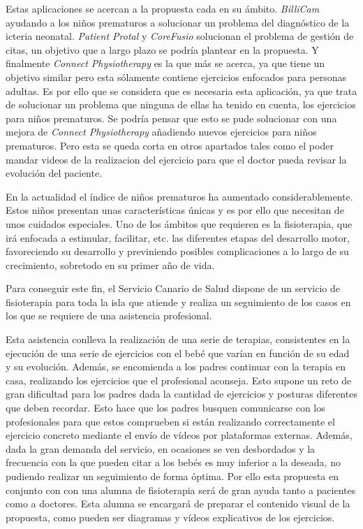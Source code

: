 \medskip
Estas aplicaciones se acercan a la propuesta cada en su ámbito. \textit{BilliCam} ayudando
a los niños prematuros a solucionar un problema del diagnóstico de la icteria neonatal.
\textit{Patient Protal} y \textit{CoreFusio} solucionan el problema de gestión de citas, un
objetivo que a largo plazo se podría plantear en la propuesta. Y finalmente
\textit{Connect Physiotherapy} es la que más se acerca, ya que tiene un objetivo similar
pero esta sólamente contiene ejercicios enfocados para personas adultas. Es por ello que
se considera que es necesaria esta aplicación, ya que trata de solucionar un problema que
ninguna de ellas ha tenido en cuenta, los ejercicios para niños prematuros. Se podría pensar
que esto se pude solucionar con una mejora de \textit{Connect Physiotherapy} añadiendo nuevos
ejercicios para niños prematuros. Pero esta se
queda corta en otros apartados tales como el poder mandar videos de la realizacion del
ejercicio para que el doctor pueda revisar la evolución del paciente.

\bigskip
En la actualidad el índice de niños prematuros ha aumentado considerablemente. Estos niños presentan
unas características únicas y es por ello que necesitan de unos cuidados especiales. Uno de los
ámbitos que requieren es la fisioterapia, que irá enfocada a estimular, facilitar, etc. las
diferentes etapas del desarrollo motor, favoreciendo su desarrollo y previniendo posibles
complicaciones a lo largo de su crecimiento, sobretodo en su primer año de vida.

Para conseguir este fin, el Servicio Canario de Salud dispone de un servicio de fisioterapia
para toda la isla que atiende y realiza un seguimiento de los casos en los que se requiere de
una asistencia profesional.

Esta asistencia conlleva la realización de una serie de terapias, consistentes en
la ejecución de una serie de ejercicios con el bebé que varían en función de su edad y su
evolución. Además, se encomienda a los padres continuar con la terapia en casa, realizando
los ejercicios que el profesional aconseja. Esto supone un reto de gran dificultad para los
padres dada la cantidad de ejercicios y posturas diferentes que deben recordar. Esto hace que
los padres busquen comunicarse con los profesionales para que estos comprueben si están
realizando correctamente el ejercicio concreto mediante el envío de vídeos por plataformas
externas. Además, dada la gran demanda del servicio, en ocasiones se ven desbordados y la
frecuencia con la que pueden citar a los bebés es muy inferior a la deseada, no pudiendo
realizar un seguimiento de forma óptima. Por ello esta propuesta en conjunto
con con una alumna de fisioterapia será de gran ayuda tanto
a pacientes como a doctores. Esta alumna se encargará de preparar el
contenido visual de la propuesta, como pueden ser diagramas y vídeos
explicativos de los ejercicios.

